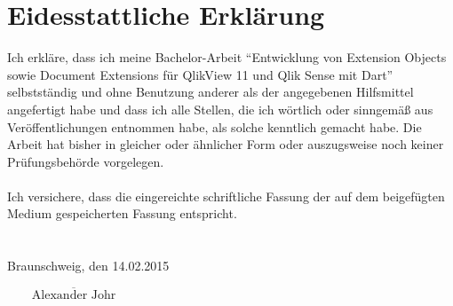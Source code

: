 \newpage
\mbox{}
\newpage


\clearpage
\section*{Eidesstattliche Erklärung}
Ich erkläre, dass ich meine Bachelor-Arbeit "`Entwicklung von Extension Objects sowie Document Extensions für QlikView 11 und Qlik Sense mit Dart"' selbstständig und ohne Benutzung anderer als der angegebenen Hilfsmittel angefertigt habe und dass ich alle Stellen, die ich wörtlich oder sinngemäß aus Veröffentlichungen entnommen habe, als solche kenntlich gemacht habe. Die Arbeit hat bisher in gleicher oder ähnlicher Form oder auszugsweise noch keiner Prüfungsbehörde vorgelegen.\\\\

Ich versichere, dass die eingereichte schriftliche Fassung der auf dem beigefügten Medium gespeicherten Fassung entspricht.
\\\\\\
\noindent Braunschweig, den 14.02.2015
\begin{flushright}
$\overline{~~~~~~~~~\mbox{Alexander Johr}~~~~~~~~~}$
\end{flushright}

\newpage
\mbox{}